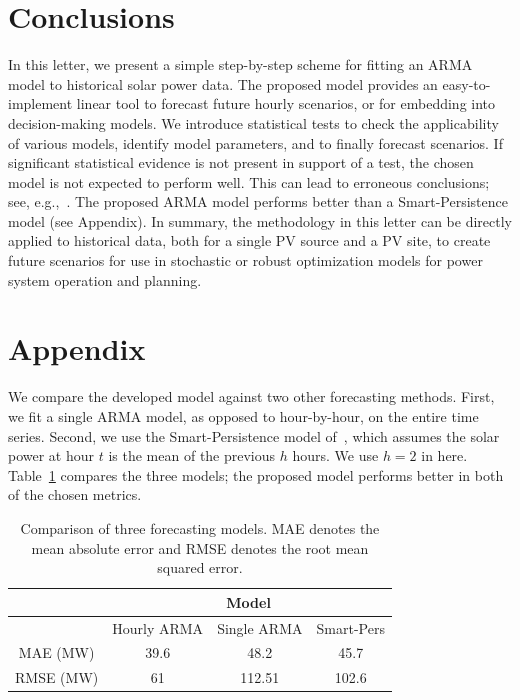 \documentclass[letter]{IEEEtran}
\begin{document}
\section{Conclusions}
In this letter, we present a simple step-by-step scheme for fitting an ARMA 
model to 
historical solar power data. The proposed model provides an easy-to-implement 
linear tool to forecast future hourly scenarios, or for embedding into 
decision-making models. 
We introduce statistical tests to check the applicability of various models, 
identify model parameters, and to finally forecast scenarios. If significant  statistical evidence is not present in support of a  test, the chosen model is not expected to perform well. This can lead to 
erroneous conclusions; see, 
e.g.,~\cite{kwiatkowski1992testing,phillips1988testing}. 
The proposed ARMA model performs better than a Smart-Persistence model (see Appendix). 
In summary, the methodology in this letter can be directly applied to historical data,  both for a single PV source and a PV site,
to create future scenarios for use in stochastic or robust optimization models 
for power system operation and planning. 


\section*{Appendix} \label{sec:appendix}

We compare the developed model against two other forecasting methods. First, we 
fit a single ARMA model, as opposed to hour-by-hour, on the entire time series. 
Second, we use the Smart-Persistence model of~\cite{lauret2016solar}, which 
assumes the solar power at hour $t$ is the mean of the previous $h$ hours. We 
use $h=2$ in here.
Table~\ref{tab:compare} compares the three models; the proposed model performs 
better in both of the chosen metrics. 

\begin{table}[h!]
	\centering
	\caption{Comparison of three forecasting models. MAE denotes the mean absolute 
		error and RMSE denotes the root mean squared error.}
	\label{tab:compare}
	\begin{tabular}{c|ccc}
		\toprule
		\multicolumn{1}{l}{} & \multicolumn{3}{c}{Model}              \\ \hline
		& Hourly ARMA & Single ARMA & Smart-Pers \\ \hline
		MAE (MW)                 & 39.6        & 48.2        & 45.7   \\
		RMSE (MW)                & 61          & 112.51      & 102.6   \\ \bottomrule
	\end{tabular}
\end{table}
\end{document}
